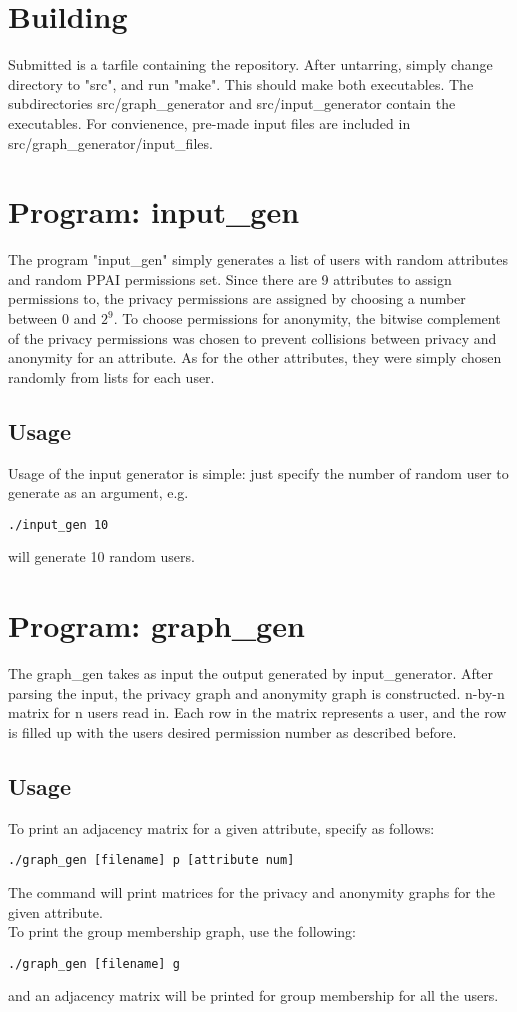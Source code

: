 \documentclass{article}
\begin{document}
\section{Building}
Submitted is a tarfile containing the repository. After untarring, simply 
change directory to "src", and run "make". This should make both executables.
The subdirectories src/graph\_generator and src/input\_generator contain
the executables. For convienence, pre-made input files are included in 
src/graph\_generator/input\_files.

\section{Program: input\_gen}
The program "input\_gen" simply generates a list of users with random 
attributes and random PPAI permissions set. Since there are 9 attributes to
assign permissions to, the privacy permissions are assigned by choosing a
number between 0 and \(2^9\). To choose permissions for anonymity, the
bitwise complement of the privacy permissions was chosen to prevent collisions
between privacy and anonymity for an attribute. As for the other attributes, 
they were simply chosen randomly from lists for each user.

\subsection{Usage}
Usage of the input generator is simple: just specify the number of random user
to generate as an argument, e.g.
\begin{verbatim}
./input_gen 10
\end{verbatim}
will generate 10 random users.

\section{Program: graph\_gen}
The graph\_gen takes as input the output generated by input\_generator.
After parsing the input, the privacy graph and anonymity graph is constructed.
n-by-n matrix for n users read in. Each row in the matrix represents a user, 
and the row is filled up with the users desired permission number as described
before. 

\subsection{Usage}
To print an adjacency matrix for a given attribute, specify as follows: 
\begin{verbatim}
./graph_gen [filename] p [attribute num]
\end{verbatim}
The command will print matrices for the privacy and anonymity graphs for
the given attribute.\\

\noindent
To print the group membership graph, use the following: 
\begin{verbatim}
./graph_gen [filename] g
\end{verbatim}
and an adjacency matrix will be printed for group membership for all the users.
\end{document}
